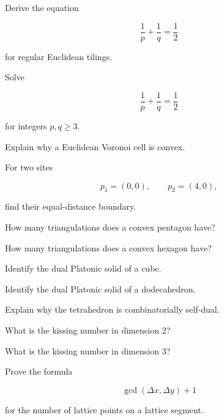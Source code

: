 \begin{exercise}[2]
Derive the equation

\[
\frac1p+\frac1q=\frac12
\]

for regular Euclidean tilings.
\end{exercise}

\begin{exercise}[2]
Solve

\[
\frac1p+\frac1q=\frac12
\]

for integers \(p,q\geq3\).
\end{exercise}

\begin{exercise}[2]
Explain why a Euclidean Voronoi cell is convex.
\end{exercise}

\begin{exercise}[2]
For two sites

\[
p_1=(0,0),
\qquad
p_2=(4,0),
\]

find their equal-distance boundary.
\end{exercise}

\begin{exercise}[2]
How many triangulations does a convex pentagon have?
\end{exercise}

\begin{exercise}[2]
How many triangulations does a convex hexagon have?
\end{exercise}

\begin{exercise}[2]
Identify the dual Platonic solid of a cube.
\end{exercise}

\begin{exercise}[2]
Identify the dual Platonic solid of a dodecahedron.
\end{exercise}

\begin{exercise}[2]
Explain why the tetrahedron is combinatorially self-dual.
\end{exercise}

\begin{exercise}[2]
What is the kissing number in dimension \(2\)?
\end{exercise}

\begin{exercise}[2]
What is the kissing number in dimension \(3\)?
\end{exercise}

\begin{exercise}[3]
Prove the formula

\[
\gcd(\Delta x,\Delta y)+1
\]

for the number of lattice points on a lattice segment.
\end{exercise}


